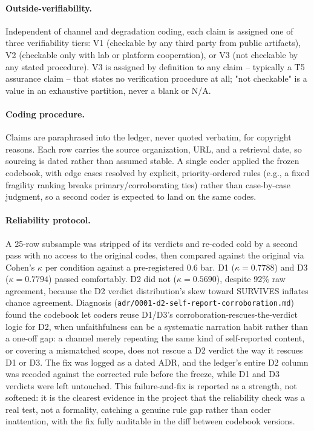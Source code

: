 \paragraph{Outside-verifiability.} Independent of channel and degradation coding, each
claim is assigned one of three verifiability tiers: V1 (checkable by any third party from
public artifacts), V2 (checkable only with lab or platform cooperation), or V3 (not
checkable by any stated procedure). V3 is assigned by definition to any claim -- typically
a T5 assurance claim -- that states no verification procedure at all; "not checkable" is
a value in an exhaustive partition, never a blank or N/A.

\paragraph{Coding procedure.} Claims are paraphrased into the ledger, never quoted
verbatim, for copyright reasons. Each row carries the source organization, URL, and a
retrieval date, so sourcing is dated rather than assumed stable. A single coder applied
the frozen codebook, with edge cases resolved by explicit, priority-ordered rules (e.g., a
fixed fragility ranking breaks primary/corroborating ties) rather than case-by-case
judgment, so a second coder is expected to land on the same codes.

\paragraph{Reliability protocol.} A 25-row subsample was stripped of its verdicts and
re-coded cold by a second pass with no access to the original codes, then compared
against the original via Cohen's $\kappa$ per condition against a pre-registered 0.6 bar.
D1 ($\kappa=0.7788$) and D3 ($\kappa=0.7794$) passed comfortably. D2 did not
($\kappa=0.5690$), despite 92\% raw agreement, because the D2 verdict distribution's skew
toward SURVIVES inflates chance agreement. Diagnosis
(\texttt{adr/0001-d2-self-report-corroboration.md}) found the codebook let coders reuse
D1/D3's corroboration-rescues-the-verdict logic for D2, when unfaithfulness can be a
systematic narration habit rather than a one-off gap: a channel merely repeating the same
kind of self-reported content, or covering a mismatched scope, does not rescue a D2
verdict the way it rescues D1 or D3. The fix was logged as a dated ADR, and the ledger's
entire D2 column was recoded against the corrected rule before the freeze, while D1 and D3
verdicts were left untouched. This failure-and-fix is reported as a strength, not
softened: it is the clearest evidence in the project that the reliability check was a real
test, not a formality, catching a genuine rule gap rather than coder inattention, with the
fix fully auditable in the diff between codebook versions.

